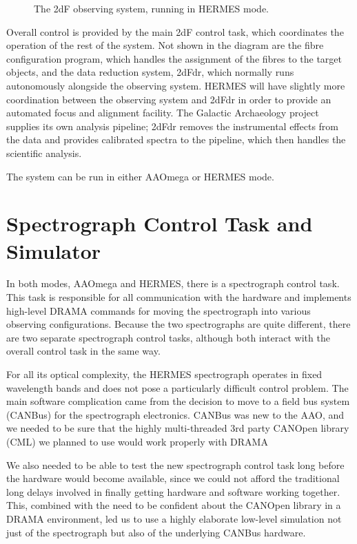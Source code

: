 \begin{figure}
\caption{The 2dF observing system, running in HERMES mode.}
\end{figure}

Overall control is provided by the main 2dF control task, which coordinates the operation of the rest of the system. Not shown in the diagram are the fibre configuration program, which handles the assignment of the fibres to the target objects, and the data reduction system, 2dFdr, which normally runs autonomously alongside the observing system. HERMES will have slightly more coordination between the observing system and 2dFdr in order to provide an automated focus and alignment facility. The Galactic Archaeology project supplies its own analysis pipeline; 2dFdr removes the instrumental effects from the data and provides calibrated spectra to the pipeline, which then handles the scientific analysis.

The system can be run in either AAOmega or HERMES mode.

\section{Spectrograph Control Task and Simulator}

In both modes, AAOmega and HERMES, there is a spectrograph control task. This task is responsible for all communication with the hardware and implements high-level DRAMA commands for moving the spectrograph into various observing configurations. Because the two spectrographs are quite different, there are two separate spectrograph control tasks, although both interact with the overall control task in the same way.

For all its optical complexity, the HERMES spectrograph operates in fixed wavelength bands and does not pose a particularly difficult control problem. The main software complication came from the decision to move to a field bus system (CANBus) for the spectrograph electronics. CANBus was new to the AAO, and we needed to be sure that the highly multi-threaded 3rd party CANOpen library (CML) we planned to use would work properly with DRAMA

We also needed to be able to test the new spectrograph control task long before the hardware would become available, since we could not afford the traditional long delays involved in finally getting hardware and software working together. This, combined with the need to be confident about the CANOpen library in a DRAMA environment, led us to use a highly elaborate low-level simulation not just of the spectrograph but also of the underlying CANBus hardware.


